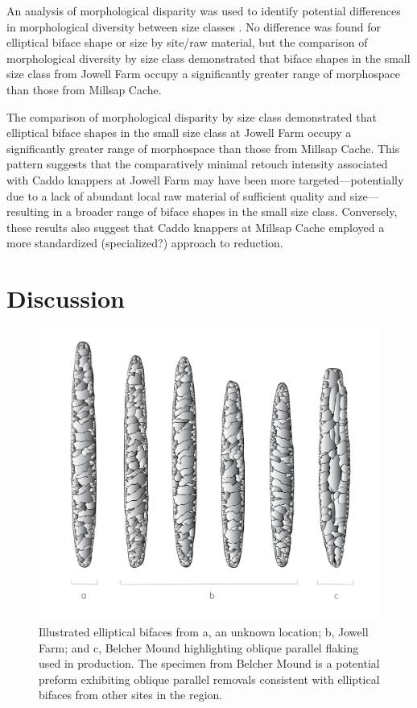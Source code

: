 \documentclass[]{interact}
\theoremstyle{plain}%
\theoremstyle{definition}
\theoremstyle{remark}
\begin{document}
An analysis of morphological disparity was used to identify potential
differences in morphological diversity between size classes
\citep{RN11107,RN7041,RN5694}. No difference was found for elliptical
biface shape or size by site/raw material, but the comparison of
morphological diversity by size class demonstrated that biface shapes in
the small size class from Jowell Farm occupy a significantly greater
range of morphospace than those from Millsap Cache.

The comparison of morphological disparity by size class demonstrated
that elliptical biface shapes in the small size class at Jowell Farm
occupy a significantly greater range of morphospace than those from
Millsap Cache. This pattern suggests that the comparatively minimal
retouch intensity associated with Caddo knappers at Jowell Farm may have
been more targeted---potentially due to a lack of abundant local raw
material of sufficient quality and size---resulting in a broader range
of biface shapes in the small size class. Conversely, these results also
suggest that Caddo knappers at Millsap Cache employed a more
standardized (specialized?) approach to reduction.

\hypertarget{discussion}{%
\section{Discussion}\label{discussion}}

\begin{figure}\centering
\includegraphics[width=\linewidth]{figs/elliptical.illustration.png}
\caption{Illustrated elliptical bifaces from a, an unknown location; b, Jowell Farm; and c, Belcher Mound highlighting oblique parallel flaking used in production. The specimen from Belcher Mound is a potential preform exhibiting oblique parallel removals consistent with elliptical bifaces from other sites in the region.}
\label{fig:illustration}
\end{figure}
\end{document}
